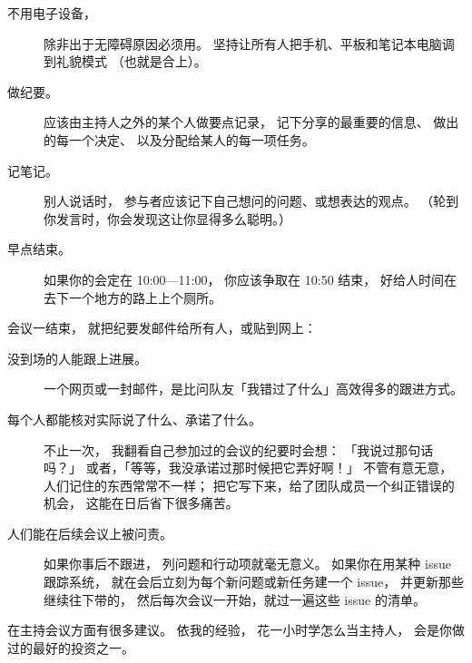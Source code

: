 \begin{description}
\item[不用电子设备，]
  除非出于无障碍原因必须用。
  坚持让所有人把手机、平板和笔记本电脑调到礼貌模式
  （也就是合上）。

\item[做纪要。]
  应该由主持人之外的某个人做要点记录，
  记下分享的最重要的信息、
  做出的每一个决定、
  以及分配给某人的每一项任务。

\item[记笔记。]
  别人说话时，
  参与者应该记下自己想问的问题、或想表达的观点。
  （轮到你发言时，你会发现这让你显得多么聪明。）

\item[早点结束。]
  如果你的会定在 10:00—11:00，
  你应该争取在 10:50 结束，
  好给人时间在去下一个地方的路上上个厕所。

\end{description}

会议一结束，
就把纪要发邮件给所有人，或贴到网上：

\begin{description}

\item[没到场的人能跟上进展。]
  一个网页或一封邮件，是比问队友「我错过了什么」高效得多的跟进方式。

\item[每个人都能核对实际说了什么、承诺了什么。]
  不止一次，
  我翻看自己参加过的会议的纪要时会想：
  「我说过那句话吗？」
  或者，「等等，我没承诺过那时候把它弄好啊！」
  不管有意无意，
  人们记住的东西常常不一样；
  把它写下来，给了团队成员一个纠正错误的机会，
  这能在日后省下很多痛苦。

\item[人们能在后续会议上被问责。]
  如果你事后不跟进，
  列问题和行动项就毫无意义。
  如果你在用某种 issue 跟踪系统，
  就在会后立刻为每个新问题或新任务建一个 issue，
  并更新那些继续往下带的，
  然后每次会议一开始，就过一遍这些 issue 的清单。

\end{description}

\cite{Brow2007,Broo2016,Roge2018}在主持会议方面有很多建议。
依我的经验，
花一小时学怎么当主持人，
会是你做过的最好的投资之一。

